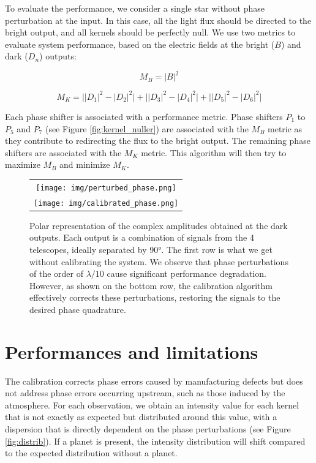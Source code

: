 \documentclass[]{spie}  %
\begin{document}
To evaluate the performance, we consider a single star without phase perturbation at the input. In this case, all the light flux should be directed to the bright output, and all kernels should be perfectly null. We use two metrics to evaluate system performance, based on the electric fields at the bright ($B$) and dark ($D_n$) outputs:

\begin{equation}
    M_B = |B|^2
\end{equation}

\begin{equation}
    M_K = \Big||D_1|^2 - |D_2|^2\Big|+\Big||D_3|^2 - |D_4|^2\Big|+\Big||D_5|^2 - |D_6|^2\Big|
\end{equation}

Each phase shifter is associated with a performance metric. Phase shifters $P_1$ to $P_5$ and $P_7$ (see Figure \ref{fig:kernel_nuller}) are associated with the $M_B$ metric as they contribute to redirecting the flux to the bright output. The remaining phase shifters are associated with the $M_K$ metric. This algorithm will then try to maximize $M_B$ and minimize $M_K$.

\begin{figure} [H]
    \begin{center}
    \begin{tabular}{c}
    \texttt{[image: img/perturbed\_phase.png]}\\
    \texttt{[image: img/calibrated\_phase.png]}
    \end{tabular}
    \end{center}
    \caption[phases] 
    { \label{fig:phases} 
    Polar representation of the complex amplitudes obtained at the dark outputs. Each output is a combination of signals from the 4 telescopes, ideally separated by 90°. The first row is what we get without calibrating the system. We observe that phase perturbations of the order of $\lambda / 10$ cause significant performance degradation. However, as shown on the bottom row, the calibration algorithm effectively corrects these perturbations, restoring the signals to the desired phase quadrature.}
\end{figure}

\section{Performances and limitations}

The calibration corrects phase errors caused by manufacturing defects but does not address phase errors occurring upstream, such as those induced by the atmosphere. For each observation, we obtain an intensity value for each kernel that is not exactly as expected but distributed around this value, with a dispersion that is directly dependent on the phase perturbations (see Figure \ref{fig:distrib}). If a planet is present, the intensity distribution will shift compared to the expected distribution without a planet. 
\end{document}
